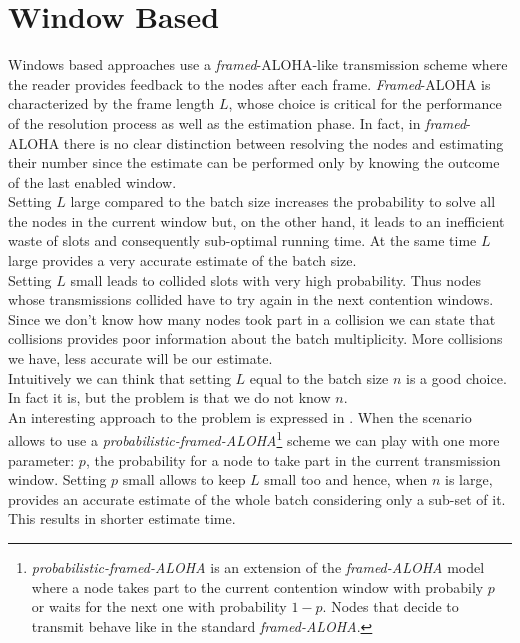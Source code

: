 \documentclass[11pt,a4paper,twoside,openright]{book}
\begin{document}
\section{Window Based}

Windows based approaches use a \emph{framed}-ALOHA-like transmission scheme where the reader provides feedback to the nodes after each frame. \emph{Framed}-ALOHA is characterized by the frame length $L$, whose choice is critical for the performance of the resolution process as well as the estimation phase. In fact, in \emph{framed}-ALOHA there is no clear distinction between resolving the nodes and estimating  their number since the estimate can be performed only by knowing the outcome of the last enabled window.\\
Setting $L$ large compared to the batch size increases the probability to solve all the nodes in the current window but, on the other hand, it leads to an inefficient waste of slots and consequently sub-optimal running time.  At the same time $L$ large provides a very accurate estimate of the batch size.\\
Setting $L$ small leads to collided slots with very high probability. Thus nodes whose transmissions collided have to try again in the next contention windows. Since we don't know how many nodes took part in a collision we can state that collisions provides poor information about the batch multiplicity. More collisions we have, less accurate will be our estimate.\\
Intuitively we can think that setting $L$ equal to the batch size  $n$ is a good choice. In fact it is, but the problem is that we do not know $n$.\\

An interesting approach to the problem is expressed in \cite{lucent}. When the scenario allows to use a \emph{probabilistic-framed-ALOHA}\footnote{\emph{probabilistic-framed-ALOHA} is an extension of the \emph{framed-ALOHA} model where a node takes part to the current contention window with probabily $p$ or waits for the next one with probability $1-p$. Nodes that decide to transmit behave like in the standard \emph{framed-ALOHA}.} scheme we can play with one more parameter: $p$, the probability for a node to take part in the current transmission window. Setting $p$ small allows to keep $L$ small too and hence, when $n$ is large, provides an accurate estimate of the whole batch considering only a sub-set of it. This results in shorter estimate time.\\
\end{document}
